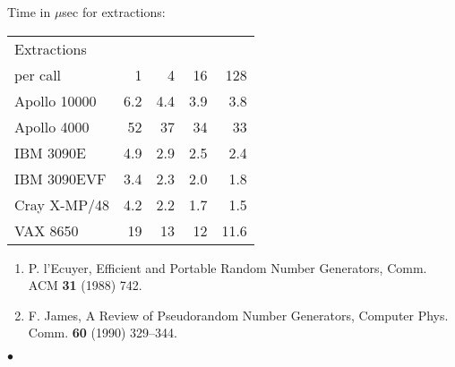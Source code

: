 \Timing
Time in $\mu$sec for extractions:
\begin{center}\begin{tabular}{|l|r|r|r|r|}
\cline{1-1}
Extractions \\  \cline{2-5}
per call         &1       &    4     & 16    & 128 \\
\hline
Apollo 10000     &  6.2   &    4.4   & 3.9   & 3.8 \\
Apollo 4000      &  52    &    37    & 34    & 33  \\
IBM 3090E        &  4.9   &    2.9   & 2.5   & 2.4 \\
IBM 3090EVF      &  3.4   &    2.3   & 2.0   & 1.8 \\
Cray X-MP/48     &  4.2   &    2.2   & 1.7   & 1.5 \\
VAX 8650         &19      &    13    & 12    & 11.6 \\
\hline
\end{tabular}\end{center}
\Refer
\begin{enumerate}
\item P.  l'Ecuyer, Efficient and Portable Random Number Generators,
Comm. ACM {\bf 31} (1988) 742.
\item F. James, A Review of Pseudorandom Number Generators,
Computer Phys. Comm. {\bf 60} (1990) 329--344.
\end{enumerate}
$\bullet$
 
